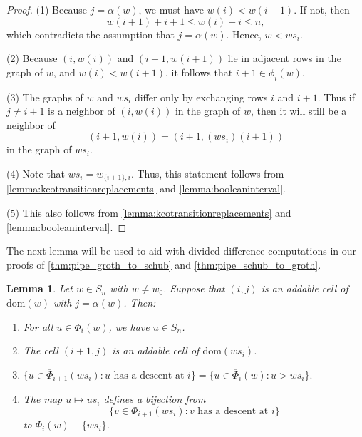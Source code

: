 \documentclass[12 pt]{amsart}
\newcommand{\dom}{\mathrm{dom}}
\newcommand{\addable}{\alpha}
\newtheorem{lemma}[Theorem]{Lemma}
\numberwithin{equation}{section}
\theoremstyle{remark}
\newcommand{\cotransitionperms}{\Phi}
\newcommand{\cotransitionindices}{\phi}
\newcommand{\kcotransitionperms}{\overline{\Phi}}
\begin{document}
		\begin{proof}
			
			\noindent (1) Because $j = \addable(w)$, we must have $w(i) < w(i + 1)$. 
			If not, then \[w(i + 1) + i + 1\leq w(i) + i\leq n,\] which contradicts the assumption that $j = \addable(w)$. 
			Hence, $w < ws_i$. 
						
			\noindent (2) Because $(i,w(i))$ and $(i + 1,w(i + 1))$ lie in adjacent rows in the graph of $w$, and $w(i) < w(i + 1)$, it follows that $i + 1 \in \cotransitionindices_i(w)$.
						
			\noindent (3) The graphs of $w$ and $ws_i$ differ only by exchanging rows $i$ and $i + 1$. 
			Thus if $j \neq i + 1$ is a neighbor of $(i,w(i))$ in the graph of $w$, then it will still be a neighbor of \[(i + 1,w(i))=(i + 1,(ws_i)(i + 1))\] in the graph of $ws_i$.
			
			\noindent (4) Note that $ws_i=w_{\{i+1\},i}$.  Thus, this statement follows from \cref{lemma:kcotransitionreplacements} and \cref{lemma:booleaninterval}.
			
			\noindent (5) This also follows from \cref{lemma:kcotransitionreplacements} and \cref{lemma:booleaninterval}.
		\end{proof}
		
		The next lemma will be used to aid with divided difference computations in our proofs of \cref{thm:pipe_groth_to_schub} and \cref{thm:pipe_schub_to_groth}.
		
		\begin{lemma}
			\label{lemma:whathappenswithwsianddescents}
			Let $w \in S_n$ with $w \neq w_0$. Suppose that $(i,j)$ is an addable cell of $\dom(w)$ with $j = \addable(w)$. Then:
			\begin{enumerate}
				\item For all $u \in \kcotransitionperms_i(w)$, we have $u \in S_n$.
				\item The cell $(i + 1,j)$ is an addable cell of $\dom(ws_i)$. 
				\item $\{u \in \kcotransitionperms_{i + 1}(ws_i) : u \text{ has a descent at } i\} = \{u \in \kcotransitionperms_{i}(w): u > ws_i\}.$
				\item The map $u \mapsto us_i$ defines a bijection from 
				\[\{v \in \cotransitionperms_{i + 1}(ws_i) : v \text{ has a descent at } i\}\]
				to $\cotransitionperms_{i}(w)-\{ws_i\}$.
			\end{enumerate} 
		\end{lemma}
	
\end{document}
